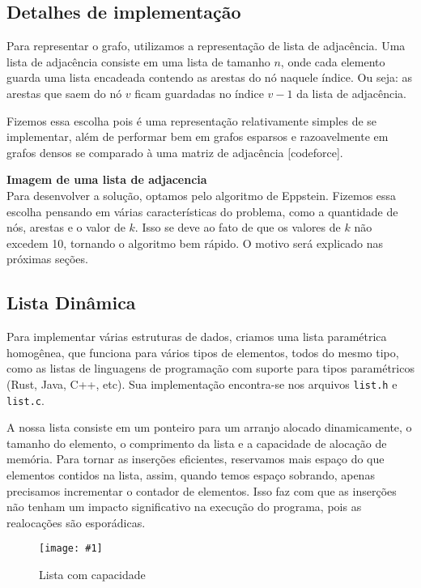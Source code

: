 \documentclass[12pt]{article}
\def\widthmod{}
\newcommand*\image[2]{\noindent \begin{figure}[htbp]
    \centering
    \texttt{[image: \#1]}
    \caption{#2}
    \label{fig: #1}
    \end{figure}
    }
\begin{document}
    \subsection{Detalhes de implementação}
    Para representar o grafo, utilizamos a representação de lista de adjacência.
    Uma lista de adjacência consiste em uma lista de tamanho $n$, onde cada
    elemento guarda uma lista encadeada contendo as arestas do nó naquele
    índice. Ou seja: as arestas que saem do nó $v$ ficam guardadas no índice
    $v-1$ da lista de adjacência.

    Fizemos essa escolha pois é uma representação relativamente simples de se
    implementar, além de performar bem em grafos esparsos e razoavelmente em
    grafos densos se comparado à uma matriz de adjacência [codeforce].

    \textbf{Imagem de uma lista de adjacencia}
    \\

    Para desenvolver a solução, optamos pelo algoritmo de Eppstein. Fizemos essa
    escolha pensando em várias características do problema, como a quantidade de
    nós, arestas e o valor de $k$. Isso se deve ao fato de que os valores de $k$
    não excedem 10, tornando o algoritmo bem rápido. O motivo será explicado nas
    próximas seções.

    \subsection{Lista Dinâmica}
    Para implementar várias estruturas de dados, criamos uma lista paramétrica
    homogênea, que funciona para vários tipos de elementos, todos do mesmo tipo,
    como as listas de linguagens de programação com suporte para tipos
    paramétricos (Rust, Java, C++, etc). Sua implementação encontra-se nos
    arquivos \texttt{list.h} e \texttt{list.c}.

    A nossa lista consiste em um ponteiro para um arranjo alocado dinamicamente,
    o tamanho do elemento, o comprimento da lista e a capacidade de alocação de
    memória. Para tornar as inserções eficientes, reservamos mais espaço do que
    elementos contidos na lista, assim, quando temos espaço sobrando, apenas
    precisamos incrementar o contador de elementos. Isso faz com que as
    inserções não tenham um impacto significativo na execução do programa, pois
    as realocações são esporádicas.

    \image{lista}{Lista com capacidade}

    \newpage
\end{document}
